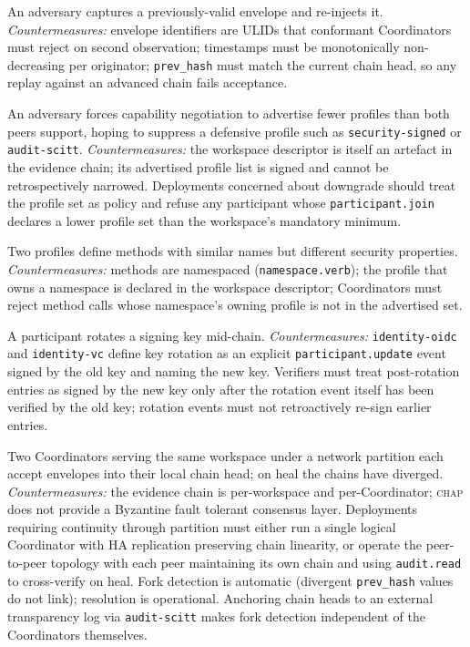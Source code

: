 \documentclass[11pt]{article}
\newcommand{\chap}{\textsc{chap}}
\begin{document}
\begin{description}[leftmargin=!,labelwidth=2.6cm]
    \item[\textbf{Replay.}] An adversary captures a previously-valid envelope and re-injects it. \emph{Countermeasures:} envelope identifiers are ULIDs that conformant Coordinators must reject on second observation; timestamps must be monotonically non-decreasing per originator; \texttt{prev\_hash} must match the current chain head, so any replay against an advanced chain fails acceptance.

    \item[\textbf{Downgrade.}] An adversary forces capability negotiation to advertise fewer profiles than both peers support, hoping to suppress a defensive profile such as \texttt{security-signed} or \texttt{audit-scitt}. \emph{Countermeasures:} the workspace descriptor is itself an artefact in the evidence chain; its advertised profile list is signed and cannot be retrospectively narrowed. Deployments concerned about downgrade should treat the profile set as policy and refuse any participant whose \texttt{participant.join} declares a lower profile set than the workspace's mandatory minimum.

    \item[\textbf{Capability confusion.}] Two profiles define methods with similar names but different security properties. \emph{Countermeasures:} methods are namespaced (\texttt{namespace.verb}); the profile that owns a namespace is declared in the workspace descriptor; Coordinators must reject method calls whose namespace's owning profile is not in the advertised set.

    \item[\textbf{Key rotation.}] A participant rotates a signing key mid-chain. \emph{Countermeasures:} \texttt{identity-oidc} and \texttt{identity-vc} define key rotation as an explicit \texttt{participant.update} event signed by the old key and naming the new key. Verifiers must treat post-rotation entries as signed by the new key only after the rotation event itself has been verified by the old key; rotation events must not retroactively re-sign earlier entries.

    \item[\textbf{Evidence-chain forking under partition.}] Two Coordinators serving the same workspace under a network partition each accept envelopes into their local chain head; on heal the chains have diverged. \emph{Countermeasures:} the evidence chain is per-workspace and per-Coordinator; \chap{} does not provide a Byzantine fault tolerant consensus layer. Deployments requiring continuity through partition must either run a single logical Coordinator with HA replication preserving chain linearity, or operate the peer-to-peer topology with each peer maintaining its own chain and using \texttt{audit.read} to cross-verify on heal. Fork detection is automatic (divergent \texttt{prev\_hash} values do not link); resolution is operational. Anchoring chain heads to an external transparency log via \texttt{audit-scitt} makes fork detection independent of the Coordinators themselves.


\end{description}
\end{document}
